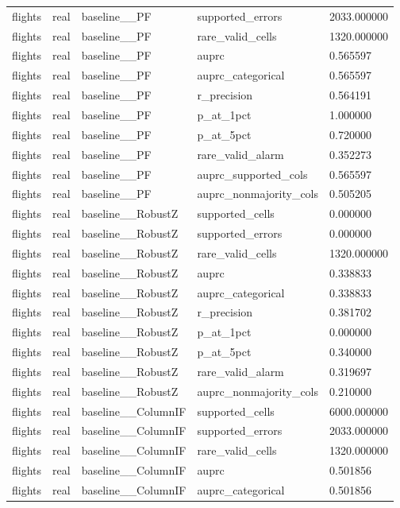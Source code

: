 \begin{tabular}{lllll}
flights & real & baseline\_\_PF & supported\_errors & 2033.000000 \\
flights & real & baseline\_\_PF & rare\_valid\_cells & 1320.000000 \\
flights & real & baseline\_\_PF & auprc & 0.565597 \\
flights & real & baseline\_\_PF & auprc\_categorical & 0.565597 \\
flights & real & baseline\_\_PF & r\_precision & 0.564191 \\
flights & real & baseline\_\_PF & p\_at\_1pct & 1.000000 \\
flights & real & baseline\_\_PF & p\_at\_5pct & 0.720000 \\
flights & real & baseline\_\_PF & rare\_valid\_alarm & 0.352273 \\
flights & real & baseline\_\_PF & auprc\_supported\_cols & 0.565597 \\
flights & real & baseline\_\_PF & auprc\_nonmajority\_cols & 0.505205 \\
flights & real & baseline\_\_RobustZ & supported\_cells & 0.000000 \\
flights & real & baseline\_\_RobustZ & supported\_errors & 0.000000 \\
flights & real & baseline\_\_RobustZ & rare\_valid\_cells & 1320.000000 \\
flights & real & baseline\_\_RobustZ & auprc & 0.338833 \\
flights & real & baseline\_\_RobustZ & auprc\_categorical & 0.338833 \\
flights & real & baseline\_\_RobustZ & r\_precision & 0.381702 \\
flights & real & baseline\_\_RobustZ & p\_at\_1pct & 0.000000 \\
flights & real & baseline\_\_RobustZ & p\_at\_5pct & 0.340000 \\
flights & real & baseline\_\_RobustZ & rare\_valid\_alarm & 0.319697 \\
flights & real & baseline\_\_RobustZ & auprc\_nonmajority\_cols & 0.210000 \\
flights & real & baseline\_\_ColumnIF & supported\_cells & 6000.000000 \\
flights & real & baseline\_\_ColumnIF & supported\_errors & 2033.000000 \\
flights & real & baseline\_\_ColumnIF & rare\_valid\_cells & 1320.000000 \\
flights & real & baseline\_\_ColumnIF & auprc & 0.501856 \\
flights & real & baseline\_\_ColumnIF & auprc\_categorical & 0.501856 \\

\end{tabular}
